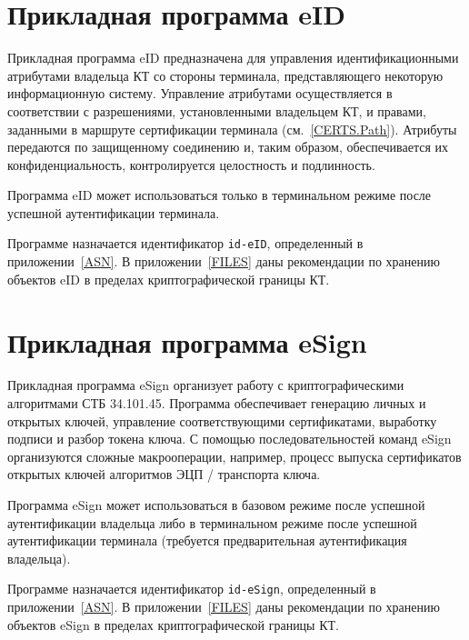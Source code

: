 \section{Прикладная программа eID}\label{OBJ.eID}

Прикладная программа eID предназначена для управления идентификационными
атрибутами владельца КТ со стороны терминала, представляющего некоторую
информационную систему.
%
Управление атрибутами осуществляется в соответствии с разрешениями,
установленными владельцем КТ, и правами, заданными в маршруте сертификации
терминала (см.~\ref{CERTS.Path}).
%
Атрибуты передаются по защищенному соединению и, таким образом, обеспечивается 
их конфиденциальность, контролируется целостность и подлинность. 

Программа eID может использоваться только в терминальном режиме
после успешной аутентификации терминала. 

Программе назначается идентификатор \verb|id-eID|, определенный в
приложении~\ref{ASN}. В приложении~\ref{FILES} даны рекомендации по хранению
объектов eID в пределах криптографической границы КТ.

\section{Прикладная программа eSign}\label{OBJ.eSign}

Прикладная программа eSign организует работу с криптографическими 
алгоритмами СТБ 34.101.45. 
%
Программа обеспечивает генерацию личных и открытых 
ключей, управление соответствующими сертификатами, 
выработку подписи и разбор токена ключа.
%
С помощью последовательностей команд eSign организуются сложные макрооперации,  
например, процесс выпуска сертификатов открытых ключей алгоритмов ЭЦП / 
транспорта ключа. 

Программа eSign может использоваться в базовом режиме 
после успешной аутентификации владельца либо в терминальном режиме 
после успешной аутентификации терминала (требуется предварительная 
аутентификация владельца). 

Программе назначается идентификатор \verb|id-eSign|, 
определенный в приложении~\ref{ASN}. В приложении~\ref{FILES}
даны рекомендации по хранению объектов eSign в пределах криптографической 
границы КТ.


